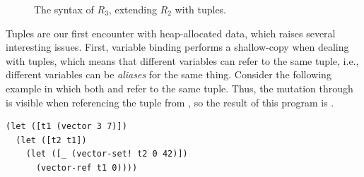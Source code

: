 \documentclass[11pt]{book}
\newcommand{\gray}[1]{{\color{lightgray} #1}}
\begin{document}
\begin{figure}[tbp]
\centering
\fbox{
\begin{minipage}{0.96\textwidth}
\[
\begin{array}{lcl}
  \Type &::=& \gray{\key{Integer} \mid \key{Boolean}}
  \mid (\key{Vector}\;\Type^{+}) \mid \key{Void}\\
  \itm{cmp} &::= & \gray{  \key{eq?} \mid \key{<} \mid \key{<=} \mid \key{>} \mid \key{>=}  } \\
  \Exp &::=& \gray{  \Int \mid (\key{read}) \mid (\key{-}\;\Exp) \mid (\key{+} \; \Exp\;\Exp)  }  \\
  &\mid&  \gray{  \Var \mid \LET{\Var}{\Exp}{\Exp}  }\\
  &\mid& \gray{  \key{\#t} \mid \key{\#f}
    \mid (\key{and}\;\Exp\;\Exp) \mid (\key{not}\;\Exp)  }\\
  &\mid& \gray{  (\itm{cmp}\;\Exp\;\Exp) \mid \IF{\Exp}{\Exp}{\Exp}  } \\
  &\mid& (\key{vector}\;\Exp^{+}) \mid
    (\key{vector-ref}\;\Exp\;\Int) \\
  &\mid& (\key{vector-set!}\;\Exp\;\Int\;\Exp)\\
  &\mid& (\key{void}) \\
  R_3 &::=& (\key{program} \;(\key{type}\;\itm{type})\; \Exp)
\end{array}
\]
\end{minipage}
}
\caption{The syntax of $R_3$, extending $R_2$ with tuples.}
\label{fig:r3-syntax}
\end{figure}


Tuples are our first encounter with heap-allocated data, which raises
several interesting issues. First, variable binding performs a
shallow-copy when dealing with tuples, which means that different
variables can refer to the same tuple, i.e., different variables can
be \emph{aliases} for the same thing. Consider the following example
in which both  and  refer to the same tuple.  Thus,
the mutation through  is visible when referencing the tuple
from , so the result of this program is .
\begin{lstlisting}
(let ([t1 (vector 3 7)])
  (let ([t2 t1])
    (let ([_ (vector-set! t2 0 42)])
      (vector-ref t1 0))))
\end{lstlisting}
\end{document}
